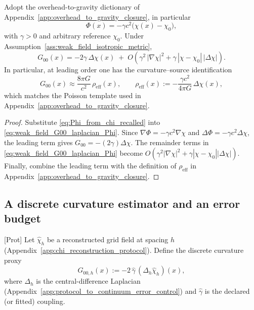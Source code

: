 \begin{corollary}
\label{cor:weak_field_G00_from_chi}
\MathTag Adopt the overhead-to-gravity dictionary of Appendix~\ref{app:overhead_to_gravity_closure}, in particular
\begin{equation}
\label{eq:Phi_from_chi_recalled}
\Phi(x)=-\gamma c^2\bigl(\chi(x)-\chi_0\bigr),
\end{equation}
with $\gamma>0$ and arbitrary reference $\chi_0$.
Under Assumption~\ref{ass:weak_field_isotropic_metric},
\begin{equation}
\label{eq:G00_from_chi}
G_{00}(x)=-2\gamma\,\Delta\chi(x)
\;+\;O\!\left(\gamma^2\,|\nabla\chi|^2+\gamma\,|\chi-\chi_0|\,|\Delta\chi|\right).
\end{equation}
In particular, at leading order one has the curvature--source identification
\begin{equation}
\label{eq:G00_rho_eff_identification}
G_{00}(x)\approx \frac{8\pi G}{c^2}\,\rho_{\mathrm{eff}}(x),
\qquad
\rho_{\mathrm{eff}}(x):=-\frac{\gamma c^2}{4\pi G}\,\Delta\chi(x),
\end{equation}
which matches the Poisson template used in Appendix~\ref{app:overhead_to_gravity_closure}.
\end{corollary}

\begin{proof}
Substitute \eqref{eq:Phi_from_chi_recalled} into \eqref{eq:weak_field_G00_laplacian_Phi}.
Since $\nabla\Phi=-\gamma c^2\nabla\chi$ and $\Delta\Phi=-\gamma c^2\Delta\chi$, the leading term gives $G_{00}=-(2\gamma)\Delta\chi$.
The remainder terms in \eqref{eq:weak_field_G00_laplacian_Phi} become $O(\gamma^2|\nabla\chi|^2+\gamma|\chi-\chi_0||\Delta\chi|)$.
Finally, combine the leading term with the definition of $\rho_{\mathrm{eff}}$ in Appendix~\ref{app:overhead_to_gravity_closure}.
\end{proof}

\subsection{A discrete curvature estimator and an error budget}
\label{subsec:weak_field_discrete_curvature_estimator}

\begin{definition}
\label{def:discrete_G00_from_chi}
\textsf{\footnotesize[Prot]} Let $\widehat\chi_h$ be a reconstructed grid field at spacing $h$ (Appendix~\ref{app:chi_reconstruction_protocol}).
Define the discrete curvature proxy
\begin{equation}
\label{eq:discrete_G00_hat}
\widehat G_{00,h}(x)
:= -2\,\widehat\gamma\,(\Delta_h\widehat\chi_h)(x),
\end{equation}
where $\Delta_h$ is the central-difference Laplacian (Appendix~\ref{app:protocol_to_continuum_error_control}) and $\widehat\gamma$ is the declared (or fitted) coupling.
\end{definition}

